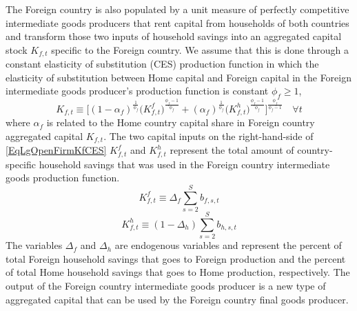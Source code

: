     The Foreign country is also populated by a unit measure of perfectly competitive intermediate goods producers that rent capital from households of both countries and transform those two inputs of household savings into an aggregated capital stock $K_{f,t}$ specific to the Foreign country. We assume that this is done through a constant elasticity of substitution (CES) production function in which the elasticity of substitution between Home capital and Foreign capital in the Foreign intermediate goods producer's production function is constant $\phi_f\geq 1$,
    \begin{equation}\label{EqLgOpenFirmKfCES}
      K_{f,t}\equiv \biggl[(1 - \alpha_f)^\frac{1}{\phi_f}\bigl(K^f_{f,t}\bigr)^\frac{\phi_f-1}{\phi_f} + (\alpha_f)^\frac{1}{\phi_f}\bigl(K^h_{f,t}\bigr)^\frac{\phi_f-1}{\phi_f}\biggr]^\frac{\phi_f}{\phi_f-1} \quad\forall t
    \end{equation}
    where $\alpha_f$ is related to the Home country capital share in Foreign country aggregated capital $K_{f,t}$. The two capital inputs on the right-hand-side of \eqref{EqLgOpenFirmKfCES} $K^f_{f,t}$ and $K^h_{f,t}$ represent the total amount of country-specific household savings that was used in the Foreign country intermediate goods production function.
    \begin{equation}\label{EqLgOpenFirmKff}
      K^f_{f,t} \equiv \Delta_f \sum_{s=2}^S b_{f,s,t}
    \end{equation}
    \begin{equation}\label{EqLgOpenFirmKfh}
      K^h_{f,t} \equiv (1 - \Delta_h)\sum_{s=2}^S b_{h,s,t}
    \end{equation}
    The variables $\Delta_f$ and $\Delta_h$ are endogenous variables and represent the percent of total Foreign household savings that goes to Foreign production and the percent of total Home household savings that goes to Home production, respectively. The output of the Foreign country intermediate goods producer is a new type of aggregated capital that can be used by the Foreign country final goods producer.

